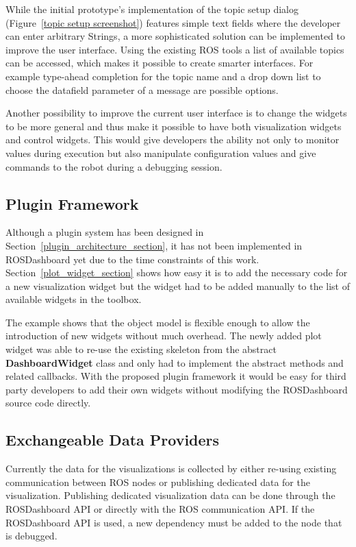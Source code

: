 While the initial prototype's implementation of the topic setup dialog (Figure~\ref{topic setup screenshot}) features simple text fields where the developer can enter arbitrary Strings, a more sophisticated solution can be implemented to improve the user interface. Using the existing ROS tools a list of available topics can be accessed, which makes it possible to create smarter interfaces. For example type-ahead completion for the topic name and a drop down list to choose the datafield parameter of a message are possible options.

Another possibility to improve the current user interface is to change the widgets to be more general and thus make it possible to have both visualization widgets and control widgets. This would give developers the ability not only to monitor values during execution but also manipulate configuration values and give commands to the robot during a debugging session.

\subsection{Plugin Framework}
Although a plugin system has been designed in Section~\ref{plugin_architecture_section}, it has not been implemented in ROSDashboard yet due to the time constraints of this work. Section~\ref{plot_widget_section} shows how easy it is to add the necessary code for a new visualization widget but the widget had to be added manually to the list of available widgets in the toolbox.

The example shows that the object model is flexible enough to allow the introduction of new widgets without much overhead. The newly added plot widget was able to re-use the existing skeleton from the abstract \textbf{DashboardWidget} class and only had to implement the abstract methods and related callbacks. With the proposed plugin framework it would be easy for third party developers to add their own widgets without modifying the ROSDashboard source code directly.

\subsection{Exchangeable Data Providers}
Currently the data for the visualizations is collected by either re-using existing communication between ROS nodes or publishing dedicated data for the visualization. Publishing dedicated visualization data can be done through the ROSDashboard API or directly with the ROS communication API. If the ROSDashboard API is used, a new dependency must be added to the node that is debugged.

